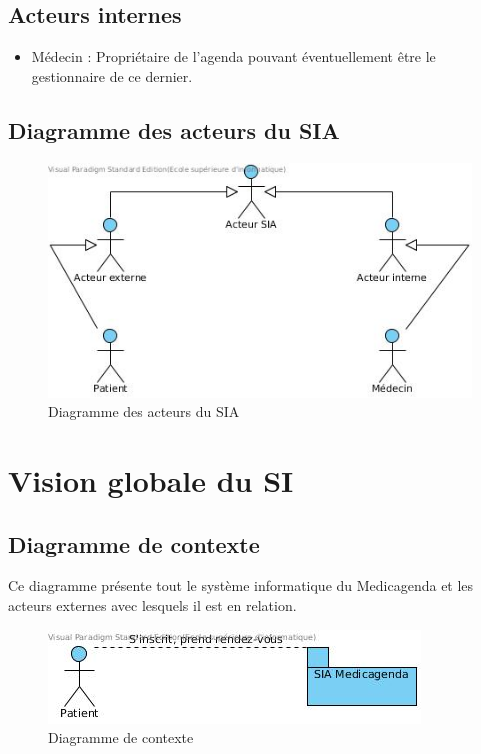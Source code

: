 \documentclass[a4paper, 11pt]{report}
\begin{document}
\subsection{Acteurs internes}
\begin{itemize}
	\item Médecin : Propriétaire de l'agenda pouvant éventuellement être le
		gestionnaire de ce dernier.
\end{itemize}
\subsection{Diagramme des acteurs du SIA}
\begin{figure}[hb]
	\centering
	\includegraphics[scale=0.7]{acteurs.jpg}
	\caption{Diagramme des acteurs du SIA}
	\label{fig:acteurs}
\end{figure}
\newpage
\section{Vision globale du SI}
\subsection{\label{dc}Diagramme de contexte}
Ce diagramme présente tout le système informatique du Medicagenda et les acteurs 
externes avec lesquels il est en relation. 
\begin{figure}[hb]
	\centering
	\includegraphics[scale=0.7]{contexte.jpg}
	\caption{Diagramme de contexte}
	\label{fig:contexte}
\end{figure}
\end{document}
